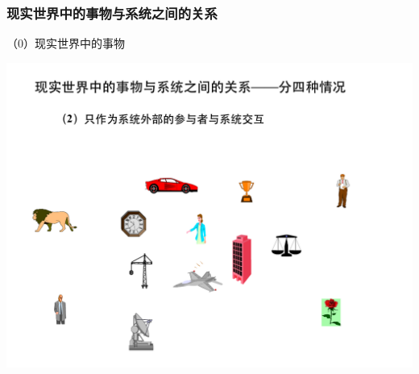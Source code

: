\documentclass[compress]{beamer}
\begin{document}
\begin{frame}
  \frametitle{现实世界中的事物与系统之间的关系}
  \begin{overprint}
     {
（0）现实世界中的事物 \\
    \begin{center}
      \centering\includegraphics[width=0.8\hsize]{physicalworld.pdf}
    \end{center}
  }



\end{overprint}
\end{frame}
\end{document}
